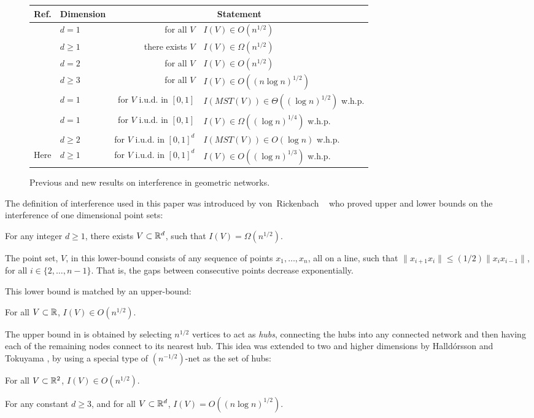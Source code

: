 \documentclass{patmorin}
\newcommand{\mst}{\mathit{MST}}
\begin{document}
\begin{figure}
\begin{center}
  \begin{tabular}{|l|l|r@{, }l|}\hline
    Ref. & Dimension & \multicolumn{2}{c|}{Statement} \\ \hline
    \cite{vR05} & $d=1$ & for all $V$ & $I(V)\in O(n^{1/2})$ \\
    \cite{vR05} & $d\ge 1$ & there exists $V$ & $I(V)\in \Omega(n^{1/2})$ \\
    \cite{ht08} & $d=2$ & for all $V$ & $I(V)\in O(n^{1/2})$ \\
    \cite{ht08} & $d\ge 3$ & for all $V$ & $I(V)\in O((n\log n)^{1/2})$ \\
    \cite{kkmns10} & $d= 1$ & for $V$ i.u.d. in $[0,1]$ & $I(\mst(V))\in \Theta((\log n)^{1/2})$ w.h.p. \\
    \cite{kkmns10,vR05} & $d = 1$ & for $V$ i.u.d. in $[0,1]$  & $I(V)\in\Omega((\log n)^{1/4})$ w.h.p.  \\
    \cite{kdh11} & $d\ge 2$ & for $V$ i.u.d. in $[0,1]^d$ & $I(\mst(V))\in O(\log n)$ w.h.p.  \\
    Here & $d\ge 1$ & for $V$ i.u.d. in $[0,1]^d$  & $I(V)\in O((\log n)^{1/3})$ w.h.p.  \\ \hline
  \end{tabular}
\end{center}
\caption{Previous and new results on interference in geometric networks.}
\end{figure}

The definition of interference used in this paper was introduced by
von~Rickenbach \etal\ \cite{vR05} who proved upper and
lower bounds on the interference of one dimensional point sets:
\begin{thm}
For any integer $d\ge 1$, there exists $V\subset\mathbb{R}^{d}$, such
that $I(V)=\Omega(n^{1/2})$.
\end{thm}
The point set, $V$, in this lower-bound consists of any sequence of
points $x_1,\ldots,x_n$, all on a line, such that $\|x_{i+1}x_i\| \le (1/2)\|x_{i}x_{i-1}\|$,
for all $i\in\{2,\ldots,n-1\}$.  That is, the gaps between consecutive
points decrease exponentially.

This lower bound is matched by an upper-bound:
\begin{thm}
For all $V\subset\mathbb{R}$, $I(V)\in O(n^{1/2})$.
\end{thm}
The upper bound in  is obtained by selecting $n^{1/2}$
vertices to act as \emph{hubs}, connecting the hubs into any connected
network and then having each of the remaining nodes connect to its
nearest hub.  This idea was extended to two and higher dimensions
by Halld\'orsson and Tokuyama \cite{ht08}, by using a special type of
$(n^{-1/2})$-net as the set of hubs:
\begin{thm}
For all $V\subset\mathbb{R}^2$, $I(V)\in O(n^{1/2})$.  
\end{thm}
\begin{thm}
  For any constant $d\ge 3$, and for all $V\subset\mathbb{R}^d$, $I(V)=O((n\log
  n)^{1/2})$.
\end{thm}
\end{document}
